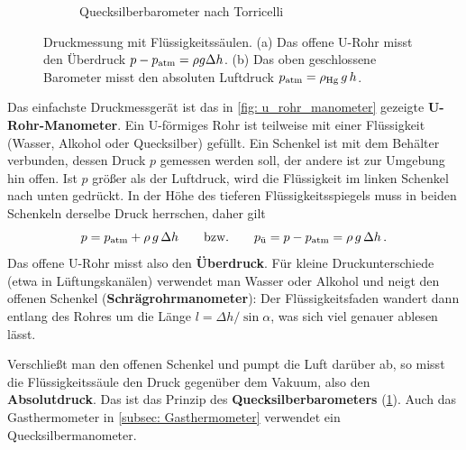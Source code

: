 \begin{figure}[htb]
\begin{subfigure}[b]{0.44\textwidth}
        \caption{Quecksilberbarometer nach Torricelli}\label{fig: torricelli_barometer}
    \end{subfigure}
    \caption{Druckmessung mit Flüssigkeitssäulen. (a) Das offene U-Rohr misst den Überdruck $p - p_{\mathrm{atm}} = \rho g \Delta h$. (b) Das oben geschlossene Barometer misst den absoluten Luftdruck $p_{\mathrm{atm}} = \rho_\text{Hg}\, g\, h$.}\label{fig: fluessigkeitsmanometer}
\end{figure}

Das einfachste Druckmessgerät ist das in \cref{fig: u_rohr_manometer} gezeigte \textbf{U-Rohr-Manometer}. Ein U-förmiges Rohr ist teilweise mit einer Flüssigkeit (Wasser, Alkohol oder Quecksilber) gefüllt. Ein Schenkel ist mit dem Behälter verbunden, dessen Druck $p$ gemessen werden soll, der andere ist zur Umgebung hin offen. Ist $p$ größer als der Luftdruck, wird die Flüssigkeit im linken Schenkel nach unten gedrückt. In der Höhe des tieferen Flüssigkeitsspiegels muss in beiden Schenkeln derselbe Druck herrschen, daher gilt
\begin{equation}\label{eq: u_rohr_manometer}
    p = p_{\mathrm{atm}} + \rho \, g \, \Delta h \qquad \text{bzw.} \qquad p_\text{ü} = p - p_{\mathrm{atm}} = \rho \, g \, \Delta h \,.
\end{equation}
Das offene U-Rohr misst also den \textbf{Überdruck}. Für kleine Druckunterschiede (etwa in Lüftungskanälen) verwendet man Wasser oder Alkohol und neigt den offenen Schenkel (\textbf{Schrägrohrmanometer}): Der Flüssigkeitsfaden wandert dann entlang des Rohres um die Länge $l = \Delta h/\sin\alpha$, was sich viel genauer ablesen lässt.

Verschließt man den offenen Schenkel und pumpt die Luft darüber ab, so misst die Flüssigkeitssäule den Druck gegenüber dem Vakuum, also den \textbf{Absolutdruck}. Das ist das Prinzip des \textbf{Quecksilberbarometers} (\cref{fig: torricelli_barometer}). Auch das Gasthermometer in \cref{subsec: Gasthermometer} verwendet ein Quecksilbermanometer.

